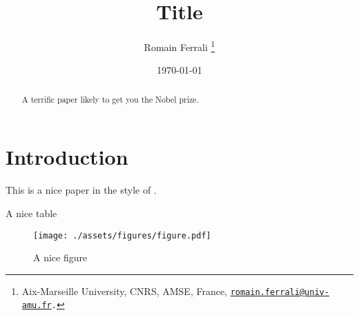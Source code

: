 \documentclass[11pt]{article}
\title{
    Title
}
\author{
    Romain Ferrali
    \thanks{
        Aix-Marseille University, CNRS, AMSE, France, {\tt \href{mailto:romain.ferrali@univ-amu.fr}{romain.ferrali@univ-amu.fr}.}
    }
}
\date{\today}
\theoremstyle{definition}
\theoremstyle{remark}
\begin{document}
\sloppy %

\if{}
    \maketitle
    \begin{abstract}
        A terrific paper likely to get you the Nobel prize.
    \end{abstract}
\fi

\section{Introduction}

This is a nice paper in the style of \citep{Ferrali}.

\begin{table}[H]
    \centering
    
    \caption{A nice table}
    \label{tab:nice_table}
\end{table}

\begin{figure}
    \centering
    \texttt{[image: ./assets/figures/figure.pdf]}
    \caption{A nice figure}
    \label{fig:nice_figure}
\end{figure}

\newpage



\newpage

\end{document}
